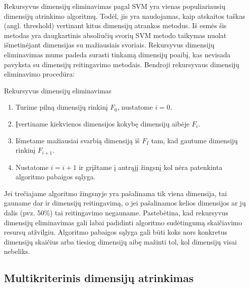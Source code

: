 Rekursyvus dimensijų eliminavimas pagal SVM yra vienas populiariausių dimensijų
atrinkimo algoritmų. Todėl, jis yra naudojamas, kaip atskaitos taškas (angl. threshold)
vertinant
kitus dimensijų atrankos metodus. Iš esmės šis metodas yra daugkartinis 
absoliučių svorių SVM metodo taikymas nuolat išmetinėjant dimensijas su 
mažiausiais svoriais. Rekursyvus dimensijų eliminavimas mums padeda surasti 
tinkamą dimensijų poaibį, kas nevisada pavyksta su dimensijų reitingavimo 
metodais. Bendroji rekursyvaus dimensijų eliminavimo procedūra:
\begin{algorithm}
\caption{Rekursyvus dimensijų eliminavimas}
\label{RFE}
 \begin{enumerate}
 \item Turime pilną dimensijų rinkinį $F_0$, nustatome $i=0$.
 \item Įvertiname kiekvienos dimensijos kokybę dimensijų aibėje $F_i$.
 \item Išmetame mažiausiai svarbią dimensiją iš $F_I$ tam, kad gautume
 dimensijų rinkinį $F_{i+1}$.
 \item Nustatome $i=i+1$ ir grįžtame į antrąjį žingsnį kol nėra patenkinta 
 algoritmo pabaigos sąlyga.
\end{enumerate}
\end{algorithm}
Jei trečiajame algoritmo žingsnyje yra pašalinama tik viena dimensija, tai gauname dar
ir dimensijų reitingavimą, o jei pašalinamos kelios dimensijos ar jų dalis
(pvz. 50\%) tai reitingavimo negauname. Pastebėtina, kad rekursyvus dimensijų
eliminavimas gali labai padidinti algoritmo sudėtingumą skaičiavimo resursų
atžvilgiu. Algoritmo pabaigos sąlyga gali būti koks nors konkretus dimensijų
skaičius arba tiesiog dimensijų aibę mažinti tol, kol dimensijų visai nebeliks.

\subsection{Multikriterinis dimensijų atrinkimas}

